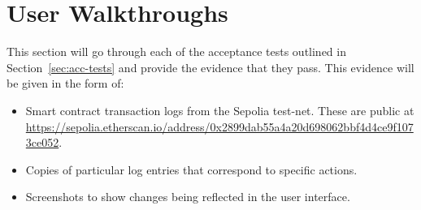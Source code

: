 
\chapter{User Walkthroughs}\label{app:user-walkthrough}

This section will go through each of the acceptance tests outlined in Section~\ref{sec:acc-tests} and provide the evidence that they pass. This evidence will be given in the form of:

\begin{itemize}
  \item Smart contract transaction logs from the Sepolia test-net. These are public at \url{https://sepolia.etherscan.io/address/0x2899dab55a4a20d698062bbf4d4ce9f1073ce052}.
  \item Copies of particular log entries that correspond to specific actions.
  \item Screenshots to show changes being reflected in the user interface.
\end{itemize}





